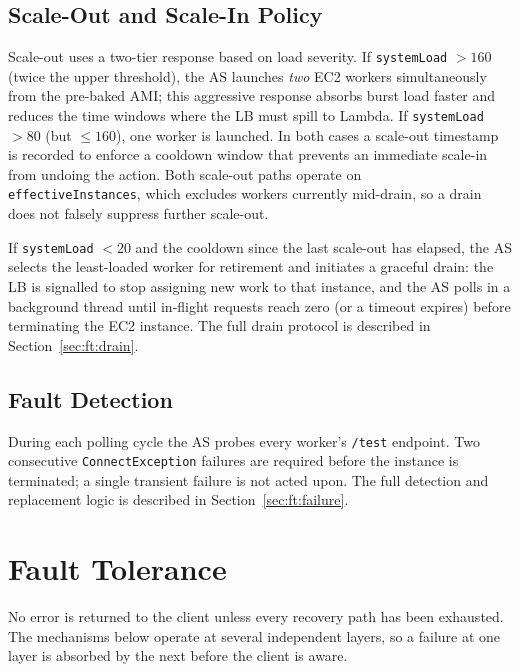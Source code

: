\documentclass[10pt]{article}
\begin{document}
\subsection{Scale-Out and Scale-In Policy}
Scale-out uses a two-tier response based on load severity. If
\texttt{systemLoad} $> 160$ (twice the upper threshold), the AS launches
\emph{two} EC2 workers simultaneously from the pre-baked AMI; this aggressive
response absorbs burst load faster and reduces the time windows where the LB
must spill to Lambda. If \texttt{systemLoad} $> 80$ (but $\leq 160$), one
worker is launched. In both cases a scale-out timestamp is recorded to enforce
a cooldown window that prevents an immediate scale-in from undoing the action.
Both scale-out paths operate on \\ \texttt{effectiveInstances}, which excludes
workers currently mid-drain, so a drain does not falsely suppress further
scale-out.

If \texttt{systemLoad} $< 20$ and the cooldown since the last scale-out has
elapsed, the AS selects the least-loaded worker for retirement and initiates a
graceful drain: the LB is signalled to stop assigning new work to that
instance, and the AS polls in a background thread until in-flight requests
reach zero (or a timeout expires) before terminating the EC2 instance.
The full drain protocol is described in Section~\ref{sec:ft:drain}.

\subsection{Fault Detection}
During each polling cycle the AS probes every worker's \texttt{/test} endpoint.
Two consecutive \texttt{ConnectException} failures are required before the
instance is terminated; a single transient failure is not acted upon.
The full detection and replacement logic is described in
Section~\ref{sec:ft:failure}.

\section{Fault Tolerance}\label{sec:fault-tolerance}
No error is returned to the client unless every recovery path has been
exhausted. The mechanisms below operate at several independent layers, so a
failure at one layer is absorbed by the next before the client is aware.
\end{document}
